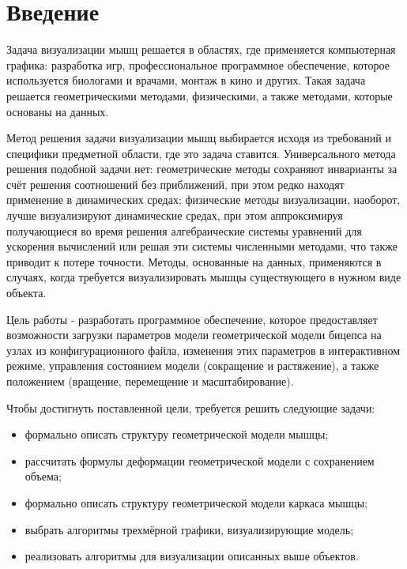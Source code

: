 \chapter*{Введение}

Задача визуализации мышц решается в областях, где применяется компьютерная графика: разработка игр, профессиональное программное обеспечение, которое используется биологами и врачами, монтаж в кино и других. Такая задача решается геометрическими методами, физическими, а также методами, которые основаны на данных.

Метод решения задачи визуализации мышц выбирается исходя из требований и специфики предметной области, где это задача ставится. Универсального метода решения подобной задачи нет: геометрические методы сохраняют инварианты за счёт решения соотношений без приближений, при этом редко находят применение в динамических средах; физические методы визуализации, наоборот, лучше визуализируют динамические средах, при этом аппроксимируя получающиеся во время решения алгебраические системы уравнений для ускорения вычислений или решая эти системы численными методами, что также приводит к потере точности. Методы, основанные на данных, применяются в случаях, когда требуется визуализировать мышцы существующего в нужном виде объекта.

Цель работы - разработать программное обеспечение, которое предоставляет возможности загрузки параметров модели геометрической модели бицепса на узлах из конфигурационного файла, изменения этих параметров в интерактивном режиме, управления состоянием модели (сокращение и растяжение), а также положением (вращение, перемещение и масштабирование).

Чтобы достигнуть поставленной цели, требуется решить следующие задачи:
\begin{itemize}
    \item формально описать структуру геометрической модели мышцы;
    \item рассчитать формулы деформации геометрической модели с сохранением объема;
    \item формально описать структуру геометрической модели каркаса мышцы;
    \item выбрать алгоритмы трехмёрной графики, визуализирующие модель;
    \item реализовать алгоритмы для визуализации описанных выше объектов.
\end{itemize}

